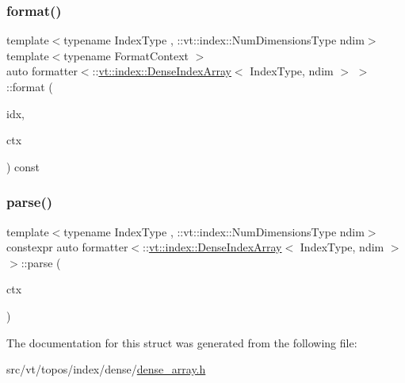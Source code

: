 \subsubsection{\texorpdfstring{format()}{format()}}
{\footnotesize\ttfamily template$<$typename Index\+Type , \+::vt\+::index\+::\+Num\+Dimensions\+Type ndim$>$ \\
template$<$typename Format\+Context $>$ \\
auto formatter$<$\+::\hyperlink{structvt_1_1index_1_1_dense_index_array}{vt\+::index\+::\+Dense\+Index\+Array}$<$ Index\+Type, ndim $>$ $>$\+::format (\begin{DoxyParamCaption}\item[{const \+::\hyperlink{structvt_1_1index_1_1_dense_index_array}{vt\+::index\+::\+Dense\+Index\+Array}$<$ Index\+Type, ndim $>$ \&}]{idx,  }\item[{Format\+Context \&}]{ctx }\end{DoxyParamCaption}) const\hspace{0.3cm}{\ttfamily [inline]}}

\mbox{\label{structformatter_3_1_1vt_1_1index_1_1_dense_index_array_3_01_index_type_00_01ndim_01_4_01_4_a4c6f116d85aaac59198a43a89d85a7d0}} 
\subsubsection{\texorpdfstring{parse()}{parse()}}
{\footnotesize\ttfamily template$<$typename Index\+Type , \+::vt\+::index\+::\+Num\+Dimensions\+Type ndim$>$ \\
constexpr auto formatter$<$\+::\hyperlink{structvt_1_1index_1_1_dense_index_array}{vt\+::index\+::\+Dense\+Index\+Array}$<$ Index\+Type, ndim $>$ $>$\+::parse (\begin{DoxyParamCaption}\item[{fmt\+::format\+\_\+parse\+\_\+context \&}]{ctx }\end{DoxyParamCaption})\hspace{0.3cm}{\ttfamily [inline]}}



The documentation for this struct was generated from the following file\+:\begin{DoxyCompactItemize}
\item 
src/vt/topos/index/dense/\hyperlink{dense__array_8h}{dense\+\_\+array.\+h}\end{DoxyCompactItemize}
